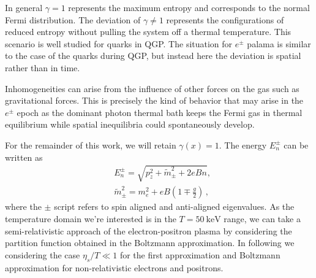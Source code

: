 \documentclass[twocolumn,preprintnumbers,amsmath,amssymb]{revtex4-2}
\begin{document}
In general $\gamma=1$ represents the maximum entropy and corresponds to the normal Fermi distribution. The deviation of $\gamma\neq1$ represents the configurations of reduced entropy without pulling the system off a thermal temperature. This scenario is well studied for quarks in QGP. The situation for $e^\pm$ palama is similar to the case of the quarks during QGP, but instead here the deviation is spatial rather than in time. 


Inhomogeneities can arise from the influence of other forces on the gas such as gravitational forces. This is precisely the kind of behavior that may arise in the $e^{\pm}$ epoch as the dominant photon thermal bath keeps the Fermi gas in thermal equilibrium while spatial inequilibria could spontaneously develop. 

For the remainder of this work, we will retain $\gamma(x)=1$. The energy $E_{n}^\pm$ can be written as
\begin{align}
&E_{n}^\pm=\sqrt{p^2_z+\tilde m^2_\pm+2eBn},\\
&\tilde{m}^2_\pm=m^2_e+eB\left(1\mp\frac{g}{2}\right)\,,
\end{align}
where the $\pm$ script refers to spin aligned and anti-aligned eigenvalues. As the temperature domain we're interested is in the $T=50\ \mathrm{keV}$ range, we can take a semi-relativistic approach of the electron-positron plasma by considering the partition function obtained in the Boltzmann approximation. In following we considering the case $\eta_s/T\ll1$ for the first approximation and Boltzmann approximation for non-relativistic electrons and positrons.
\end{document}
